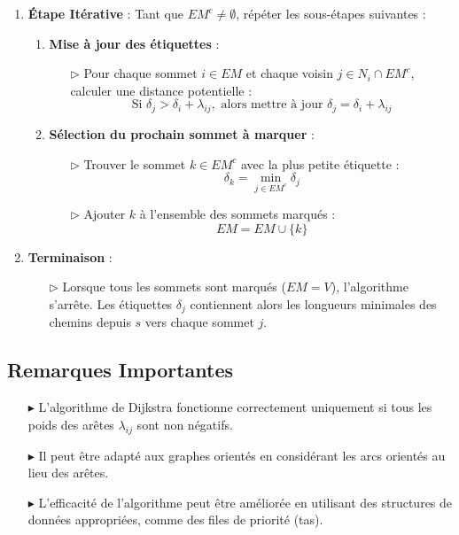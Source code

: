 \documentclass{report}
\begin{document}
\begin{multicols*}{2}
\begin{enumerate}
    \item \textbf{Étape Itérative} : Tant que \( EM^c \neq \emptyset \), répéter les sous-étapes suivantes :

    \begin{enumerate}
        \item \textbf{Mise à jour des étiquettes} :
        \begin{itemize}
            \item[\( \rhd \)] Pour chaque sommet \( i \in EM \) et chaque voisin \( j \in N_i \cap EM^c \), calculer une distance potentielle :
            \[
            \text{Si } \delta_j > \delta_i + \lambda_{ij}, \text{ alors mettre à jour } \delta_j = \delta_i + \lambda_{ij}
            \]
        \end{itemize}

        \item \textbf{Sélection du prochain sommet à marquer} :
        \begin{itemize}
            \item[\( \rhd \)] Trouver le sommet \( k \in EM^c \) avec la plus petite étiquette :
            \[
            \delta_k = \min_{j \in EM^c} \delta_j
            \]
            \item[\( \rhd \)] Ajouter \( k \) à l'ensemble des sommets marqués :
            \[
            EM = EM \cup \{ k \}
            \]
        \end{itemize}
    \end{enumerate}

    \item \textbf{Terminaison} :
    \begin{itemize}
        \item[\( \rhd \)] Lorsque tous les sommets sont marqués (\( EM = V \)), l'algorithme s'arrête. Les étiquettes \( \delta_j \) contiennent alors les longueurs minimales des chemins depuis \( s \) vers chaque sommet \( j \).
    \end{itemize}
\end{enumerate}

\subsection*{Remarques Importantes}

\begin{itemize}
    \item[\( \blacktriangleright \)] L'algorithme de Dijkstra fonctionne correctement uniquement si tous les poids des arêtes \( \lambda_{ij} \) sont non négatifs.
    \item[\( \blacktriangleright \)] Il peut être adapté aux graphes orientés en considérant les arcs orientés au lieu des arêtes.
    \item[\( \blacktriangleright \)] L'efficacité de l'algorithme peut être améliorée en utilisant des structures de données appropriées, comme des files de priorité (tas).
\end{itemize}


\end{multicols*}
\end{document}
